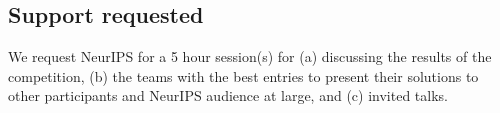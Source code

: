 
\subsection{Support requested}


We request NeurIPS for a 5 hour session(s) for (a) discussing the
results of the competition, (b) the teams with the best entries to
present their solutions to other participants and NeurIPS audience at
large, and (c) invited talks.



